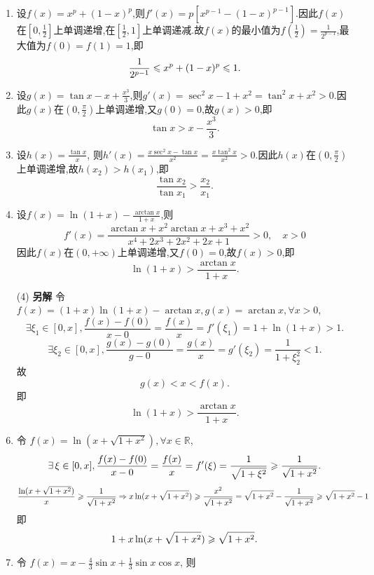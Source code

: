 \begin{solution}
    \begin{enumerate}
        \item 设$f(x) = x^p + (1-x)^p$,则$f'(x) = p[x^{p-1} - (1-x)^{p-1}]$.因此$f(x)$在$\left[ 0 , \frac{1}{2} \right]$上单调递增,在$\left[ \frac{1}{2}, 1 \right]$上单调递减.故$f(x)$的最小值为$f\left(\frac{1}{2}\right) = \frac{1}{2^{p-1}}$,最大值为$f(0) = f(1) = 1$,即
              $$
                  \frac{1}{2^{p-1}} \leqslant x^p + (1-x)^p \leqslant 1.
              $$
        \item 设$g(x) = \tan x - x + \frac{x^3}{3}$,则$g'(x) = \sec^2 x - 1 + x^2 = \tan^2 x + x^2 > 0$.因此$g(x)$在$(0, \frac{\pi}{2})$上单调递增,又$g(0) = 0$,故$g(x) > 0$,即
              $$
                  \tan x > x - \frac{x^3}{3}.
              $$
        \item 设$h(x) = \frac{\tan x}{x}$,
              则$h'(x) = \frac{x\sec^2 x - \tan x}{x^2} = \frac{x\tan^2 x}{x^2} > 0$.因此$h(x)$在$(0, \frac{\pi}{2})$上单调递增,故$h(x_2) > h(x_1)$,即
              $$
                  \frac{\tan x_2}{\tan x_1} > \frac{x_2}{x_1}.
              $$
        \item 设$f(x) = \ln(1+x) - \frac{\arctan x}{1+x}$,则
              $$f'(x) = \frac{\arctan x + x^2 \arctan x + x^3 + x^2}{x^4 + 2x^3 + 2x^2 + 2x +1} > 0 , \quad x > 0$$
              因此$f(x)$在$(0, +\infty)$上单调递增,又$f(0) = 0$,故$f(x) > 0$,即
              $$
                  \ln(1+x) > \frac{\arctan x}{1+x}.
              $$
        \item[(4)] \textbf{另解} 令 $f(x) = (1+x)\ln(1+x) - \arctan x, g(x) = \arctan x, \forall x > 0$,
            $$ \exists \xi_1 \in [0, x], \frac{f(x) - f(0)}{x-0} = \frac{f(x)}{x} = f'(\xi_1) = 1 + \ln(1+x) > 1. $$
            $$ \exists \xi_2 \in [0, x], \frac{g(x) - g(0)}{g-0} = \frac{g(x)}{x} = g'(\xi_2) = \frac{1}{1+\xi_2^2} < 1. $$
            故
            $$ g(x) < x < f(x). $$
            即
            $$ \ln(1+x) > \frac{\arctan x}{1+x}. $$
        \item 令 $f(x) = \ln(x+\sqrt{1+x^2}), \forall x \in \mathbb{R}$,
              $$ \exists \xi \in [0, x], \frac{f(x) - f(0)}{x-0} = \frac{f(x)}{x} = f'(\xi) = \frac{1}{\sqrt{1+\xi^2}} \ges \frac{1}{\sqrt{1+x^2}}. $$
              $$ \frac{\ln(x+\sqrt{1+x^2})}{x} \geqslant \frac{1}{\sqrt{1+x^2}} \Rightarrow x \ln(x+\sqrt{1+x^2}) \geqslant \frac{x^2}{\sqrt{1+x^2}} = \sqrt{1+x^2} - \frac{1}{\sqrt{1+x^2}} \geqslant \sqrt{1+x^2} - 1 $$
              即
              $$ 1+x \ln(x+\sqrt{1+x^2}) \geqslant \sqrt{1+x^2}. $$
        \item 令 $f(x) = x - \frac{4}{3} \sin x + \frac{1}{3} \sin x \cos x$, 则

\end{enumerate}
\end{solution}
